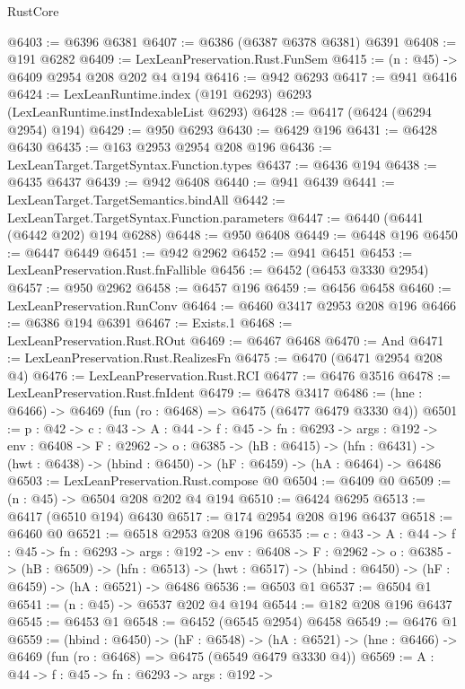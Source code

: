 \begin{lexlean}{RustCore}
\begin{coremodule}
@6403 := @6396 @6381
@6407 := @6386 (@6387 @6378 @6381) @6391
@6408 := @191 @6282
@6409 := LexLeanPreservation.Rust.FunSem
@6415 := (n : @45) -> @6409 @2954 @208 @202 @4 @194
@6416 := @942 @6293
@6417 := @941 @6416
@6424 := LexLeanRuntime.index (@191 @6293) @6293 (LexLeanRuntime.instIndexableList @6293)
@6428 := @6417 (@6424 (@6294 @2954) @194)
@6429 := @950 @6293
@6430 := @6429 @196
@6431 := @6428 @6430
@6435 := @163 @2953 @2954 @208 @196
@6436 := LexLeanTarget.TargetSyntax.Function.types
@6437 := @6436 @194
@6438 := @6435 @6437
@6439 := @942 @6408
@6440 := @941 @6439
@6441 := LexLeanTarget.TargetSemantics.bindAll
@6442 := LexLeanTarget.TargetSyntax.Function.parameters
@6447 := @6440 (@6441 (@6442 @202) @194 @6288)
@6448 := @950 @6408
@6449 := @6448 @196
@6450 := @6447 @6449
@6451 := @942 @2962
@6452 := @941 @6451
@6453 := LexLeanPreservation.Rust.fnFallible
@6456 := @6452 (@6453 @3330 @2954)
@6457 := @950 @2962
@6458 := @6457 @196
@6459 := @6456 @6458
@6460 := LexLeanPreservation.RunConv
@6464 := @6460 @3417 @2953 @208 @196
@6466 := @6386 @194 @6391
@6467 := Exists.{1}
@6468 := LexLeanPreservation.Rust.ROut
@6469 := @6467 @6468
@6470 := And
@6471 := LexLeanPreservation.Rust.RealizesFn
@6475 := @6470 (@6471 @2954 @208 @4)
@6476 := LexLeanPreservation.Rust.RCI
@6477 := @6476 @3516
@6478 := LexLeanPreservation.Rust.fnIdent
@6479 := @6478 @3417
@6486 := (hne : @6466) -> @6469 (fun (ro : @6468) => @6475 (@6477 @6479 @3330 @4))
@6501 := {p : @42} ->
  {c : @43} ->
  {A : @44} ->
  {f : @45} ->
  {fn : @6293} ->
  {args : @192} ->
  {env : @6408} ->
  {F : @2962} ->
  {o : @6385} ->
  (hB : @6415) ->
  (hfn : @6431) -> (hwt : @6438) -> (hbind : @6450) -> (hF : @6459) -> (hA : @6464) -> @6486
@6503 := LexLeanPreservation.Rust.compose @0
@6504 := @6409 @0
@6509 := (n : @45) -> @6504 @208 @202 @4 @194
@6510 := @6424 @6295
@6513 := @6417 (@6510 @194) @6430
@6517 := @174 @2954 @208 @196 @6437
@6518 := @6460 @0
@6521 := @6518 @2953 @208 @196
@6535 := {c : @43} ->
  {A : @44} ->
  {f : @45} ->
  {fn : @6293} ->
  {args : @192} ->
  {env : @6408} ->
  {F : @2962} ->
  {o : @6385} ->
  (hB : @6509) ->
  (hfn : @6513) -> (hwt : @6517) -> (hbind : @6450) -> (hF : @6459) -> (hA : @6521) -> @6486
@6536 := @6503 @1
@6537 := @6504 @1
@6541 := (n : @45) -> @6537 @202 @4 @194
@6544 := @182 @208 @196 @6437
@6545 := @6453 @1
@6548 := @6452 (@6545 @2954) @6458
@6549 := @6476 @1
@6559 := (hbind : @6450) ->
  (hF : @6548) ->
  (hA : @6521) -> (hne : @6466) -> @6469 (fun (ro : @6468) => @6475 (@6549 @6479 @3330 @4))
@6569 := {A : @44} ->
  {f : @45} ->
  {fn : @6293} ->
  {args : @192} ->

\end{coremodule}
\end{lexlean}
